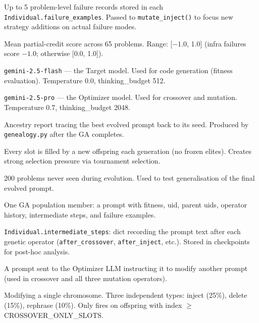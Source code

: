 \documentclass[11pt,a4paper]{report}
\newcommand{\pyfile}[1]{\texttt{#1}}
\newcommand{\fn}[1]{\texttt{#1}}
\begin{document}
\begin{description}[style=nextline, leftmargin=3cm, itemsep=3pt]
\item[Failure examples] Up to 5 problem-level failure records stored in each
  \fn{Individual.failure\_examples}.  Passed to \fn{mutate\_inject()} to focus new
  strategy additions on actual failure modes.

\item[Fitness] Mean partial-credit score across 65 problems.  Range: [$-1.0$, 1.0]
  (infra failures score $-1.0$; otherwise [0.0, 1.0]).

\item[Gemini Flash] \fn{gemini-2.5-flash} --- the Target model.  Used for code
  generation (fitness evaluation).  Temperature 0.0, thinking\_budget 512.

\item[Gemini Pro] \fn{gemini-2.5-pro} --- the Optimizer model.  Used for crossover
  and mutation.  Temperature 0.7, thinking\_budget 2048.

\item[Genealogy] Ancestry report tracing the best evolved prompt back to its seed.
  Produced by \pyfile{genealogy.py} after the GA completes.

\item[Generational replacement] Every slot is filled by a new offspring each generation
  (no frozen elites).  Creates strong selection pressure via tournament selection.

\item[Held-out set] 200 problems never seen during evolution.  Used to test
  generalisation of the final evolved prompt.

\item[Individual] One GA population member: a prompt with fitness, uid, parent uids,
  operator history, intermediate steps, and failure examples.

\item[Intermediate steps] \fn{Individual.intermediate\_steps}: dict recording the
  prompt text after each genetic operator (\fn{after\_crossover}, \fn{after\_inject},
  etc.).  Stored in checkpoints for post-hoc analysis.

\item[Meta-prompt] A prompt sent to the Optimizer LLM instructing it to modify another
  prompt (used in crossover and all three mutation operators).

\item[Mutation] Modifying a single chromosome.  Three independent types: inject (25\%),
  delete (15\%), rephrase (10\%).  Only fires on offspring with index $\geq$ CROSSOVER\_ONLY\_SLOTS.


\end{description}
\end{document}
